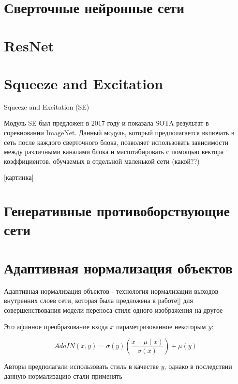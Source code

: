 \section{Сверточные нейронные сети}

\section{ResNet}

\section{Squeeze and Excitation}

Squeeze and Excitation (SE)

Модуль SE был предложен в 2017 году и показала SOTA результат в соревновании ImageNet. Данный модуль, который предполагается включать в сеть после каждого сверточного блока, позволяет использовать зависимости между различными каналами блока и масштабировать с помощью вектора коэффициентов, обучаемых в отдельной маленькой сети (какой??) 

[картинка]


\section{Генеративные противоборствующие сети}


\section{Адаптивная нормализация объектов}

Адаптивная нормализация объектов - технология нормализации выходов внутренних слоев сети, которая была предложена в работе[] для совершенствования модели переноса стиля одного изображения на другое

Это афинное преобразование входа $x$ параметризованное некоторым $y$:

$$AdaIN(x, y) = \sigma(y)(\dfrac{x - \mu(x)}{\sigma(x)}) + \mu(y)$$

Авторы предполагали использовать стиль в качестве $y$, однако в последствии данную нормализацию стали применять